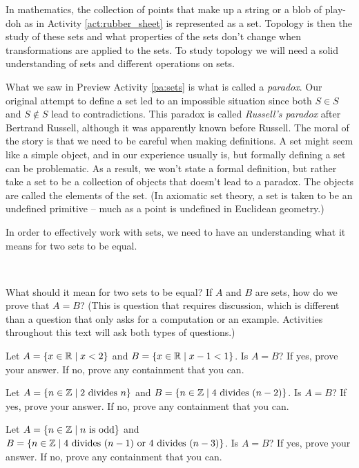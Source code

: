 In mathematics, the collection of points that make up a string or a blob of play-doh as in Activity \ref{act:rubber_sheet} is represented as a set. Topology is then the study of these sets and what properties of the sets don't change when transformations are applied to the sets. To study topology we will need a solid understanding of sets and different operations on sets. 

What we saw in Preview Activity \ref{pa:sets} is what is called a \emph{paradox}. Our original attempt to define a set led to an impossible situation since both $S \in S$ and $S \notin S$ lead to contradictions. This paradox is called \emph{Russell's paradox} after Bertrand Russell, although it was apparently known before Russell. The moral of the story is that we need to be careful when making definitions. A set might seem like a simple object, and in our experience usually is, but formally defining a set can be problematic. As a result, we won't state a formal definition, but rather take a set to be a collection of objects that doesn't lead to a paradox. The objects are called the elements of the set. (In axiomatic set theory, a set is taken to be an undefined primitive -- much as a point is undefined in Euclidean geometry.)  

In order to effectively work with sets, we need to have an understanding what it means for two sets to be equal.

\begin{activity} \label{act:set_equality} ~
	\ba
	\item What should it mean for two sets to be equal? If $A$ and $B$ are sets, how do we prove that $A = B$? (This is question that requires discussion, which is different than a question that only asks for a computation or an example. Activities throughout this text will ask both types of questions.)

	\item Let $A = \{x \in \mathbb{R} \mid x < 2\}$ and $B = \{x \in \mathbb{R} \mid x-1 < 1\}$. Is $A=B$? If yes, prove your answer. If no, prove any containment that you can.
	
	\item Let $A = \{n \in \mathbb{Z} \mid 2 \text{ divides } n\}$ and $B = \{n \in \mathbb{Z} \mid 4 \text{ divides } (n-2)\}$. Is $A=B$? If yes, prove your answer. If no, prove any containment that you can.


	\item Let $A = \{n \in \mathbb{Z} \mid n \text{ is odd}\}$ and $B = \{n \in \mathbb{Z} \mid 4 \text{ divides } (n-1)  \text{ or } 4 \text{ divides } (n-3)\}$. Is $A=B$? If yes, prove your answer. If no, prove any containment that you can.
	
	\ea

\end{activity}

